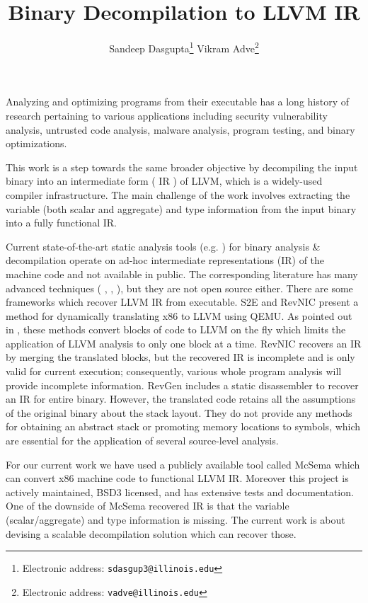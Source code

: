 \documentclass[10pt,twoside]{article}
\title{\textbf{ Binary Decompilation to LLVM IR}}
\author{Sandeep Dasgupta\thanks{Electronic address: \texttt{sdasgup3@illinois.edu}}
\qquad Vikram Adve\thanks{Electronic address: \texttt{vadve@illinois.edu}}
}
\begin{document}
\thispagestyle{empty}

\maketitle

Analyzing and optimizing programs from their executable has a long history of
research pertaining to various applications including  security vulnerability
analysis, untrusted code analysis, malware analysis, program testing, and
binary optimizations. 

This work is a step towards the same broader objective by decompiling the input binary
into an intermediate form ( IR ) of LLVM, which is a widely-used compiler
infrastructure.  The main challenge of the work involves extracting the
variable (both scalar and aggregate) and type information from the input binary
into a fully functional IR.  

Current state-of-the-art static analysis tools (e.g. \cite{HexRays, Codesurfer,
BAP}) for binary analysis \& decompilation operate on ad-hoc intermediate representations
(IR) of the machine code and not available in public.  The corresponding
literature has many advanced techniques ( \cite{SECONDWRITE-EUROSYS-2013},
\cite{DIVINE-VMCAI-2007}, \cite{POLYTYPEINFERENCE-PLDI-2016}), but they are not
open source either.  There are some frameworks which recover LLVM IR from
executable.  S2E\cite{S2E-ASPLOS-2011} and RevNIC \cite{REVNIC-EUROSYS-2010}
present a method for dynamically translating x86 to LLVM using
QEMU\cite{QEMU-ATEC-2005}.  As pointed out in \cite{SECONDWRITE-EUROSYS-2013},
these methods convert blocks of code to LLVM on the fly which limits the
application of LLVM analysis to only one block at a time. RevNIC
\cite{REVNIC-EUROSYS-2010} recovers an IR by merging the translated blocks, but
the recovered IR is incomplete and is only valid for current execution;
consequently, various whole program analysis will provide incomplete
information. RevGen \cite{REVGEN-DNSW-2011} includes a static disassembler to
recover an IR for entire binary. However, the translated code retains all the
assumptions of the original binary about the stack layout.  They do not provide
any methods for obtaining an abstract stack or promoting memory locations to
symbols, which are essential for the application of several source-level
analysis. 

For our current work we have used a publicly available tool called McSema
\cite{Mcsema}  which can convert x86 machine code to functional LLVM IR.
Moreover this project is actively maintained, BSD3 licensed, and has extensive
tests and documentation.  One of the downside of McSema recovered IR is that
the variable (scalar/aggregate) and type information is missing. The current
work is about devising a scalable decompilation solution which can recover
those.
\end{document}
